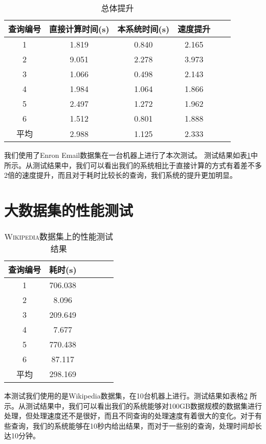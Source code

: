 \begin{table}[!tb]
    \centering
    \caption{\textsc{总体提升}}
    \begin{tabular}{cccccc}
        \toprule
        查询编号 & 直接计算时间(s) & 本系统时间(s) & 速度提升 \\
        \midrule
        1 & 1.819 & 0.840 & 2.165 \\
        2 & 9.051 & 2.278 & 3.973 \\
        3 & 1.066 & 0.498 & 2.143 \\
        4 & 1.984 & 1.064 & 1.866 \\
        5 & 2.497 & 1.272 & 1.962 \\
        6 & 1.512 & 0.801 & 1.888 \\
        \midrule
        平均 & 2.988 & 1.125 & 2.333 \\
        \bottomrule
    \end{tabular}
    \label{tab:overall_speedup}
\end{table}

我们使用了Enron Email数据集在一台机器上进行了本次测试。
测试结果如表\ref{tab:overall_speedup}中所示。从测试结果中，我们可以看出我们的系统相比于直接计算的方式有着差不多2倍的速度提升，而且对于耗时比较长的查询，我们系统的提升更加明显。

\section {大数据集的性能测试}
\begin{table}[!tb]
    \centering
    \caption{\textsc{Wikipedia数据集上的性能测试结果}}
    \begin{tabular}{cccccc}
        \toprule
        查询编号 & 耗时(s) \\
        \midrule
        1 & 706.038  \\
        2 & 8.096  \\
        3 & 209.649  \\
        4 & 7.677  \\
        5 & 770.438  \\
        6 & 87.117  \\
        \midrule
        平均 & 298.169  \\
        \bottomrule
    \end{tabular}
    \label{tab:wiki_speedup}
\end{table}
本测试我们使用的是Wikipedia数据集，在10台机器上进行。测试结果如表格\ref{tab:wiki_speedup} 所示。从测试结果中，我们可以看出我们的系统能够对100GB数据规模的数据集进行处理，但处理速度还不是很好，而且不同查询的处理速度有着很大的变化。对于有些查询，我们的系统能够在10秒内给出结果，而对于一些别的查询，处理时间却长达10分钟。
